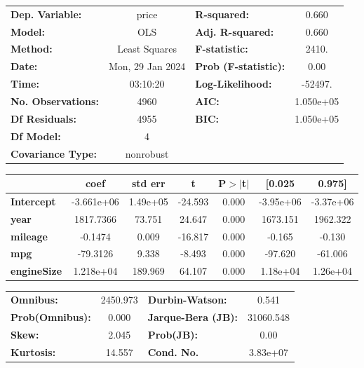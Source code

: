 \documentclass[
  letterpaper,
  DIV=11,
  numbers=noendperiod]{scrreprt}
\begin{document}
\begin{center}
\begin{tabular}{lclc}
\toprule
\textbf{Dep. Variable:}    &      price       & \textbf{  R-squared:         } &     0.660   \\
\textbf{Model:}            &       OLS        & \textbf{  Adj. R-squared:    } &     0.660   \\
\textbf{Method:}           &  Least Squares   & \textbf{  F-statistic:       } &     2410.   \\
\textbf{Date:}             & Mon, 29 Jan 2024 & \textbf{  Prob (F-statistic):} &     0.00    \\
\textbf{Time:}             &     03:10:20     & \textbf{  Log-Likelihood:    } &   -52497.   \\
\textbf{No. Observations:} &        4960      & \textbf{  AIC:               } & 1.050e+05   \\
\textbf{Df Residuals:}     &        4955      & \textbf{  BIC:               } & 1.050e+05   \\
\textbf{Df Model:}         &           4      & \textbf{                     } &             \\
\textbf{Covariance Type:}  &    nonrobust     & \textbf{                     } &             \\
\bottomrule
\end{tabular}
\begin{tabular}{lcccccc}
                    & \textbf{coef} & \textbf{std err} & \textbf{t} & \textbf{P$> |$t$|$} & \textbf{[0.025} & \textbf{0.975]}  \\
\midrule
\textbf{Intercept}  &   -3.661e+06  &     1.49e+05     &   -24.593  &         0.000        &    -3.95e+06    &    -3.37e+06     \\
\textbf{year}       &    1817.7366  &       73.751     &    24.647  &         0.000        &     1673.151    &     1962.322     \\
\textbf{mileage}    &      -0.1474  &        0.009     &   -16.817  &         0.000        &       -0.165    &       -0.130     \\
\textbf{mpg}        &     -79.3126  &        9.338     &    -8.493  &         0.000        &      -97.620    &      -61.006     \\
\textbf{engineSize} &    1.218e+04  &      189.969     &    64.107  &         0.000        &     1.18e+04    &     1.26e+04     \\
\bottomrule
\end{tabular}
\begin{tabular}{lclc}
\textbf{Omnibus:}       & 2450.973 & \textbf{  Durbin-Watson:     } &     0.541  \\
\textbf{Prob(Omnibus):} &   0.000  & \textbf{  Jarque-Bera (JB):  } & 31060.548  \\
\textbf{Skew:}          &   2.045  & \textbf{  Prob(JB):          } &      0.00  \\
\textbf{Kurtosis:}      &  14.557  & \textbf{  Cond. No.          } &  3.83e+07  \\
\bottomrule
\end{tabular}
\end{center}
\end{document}
